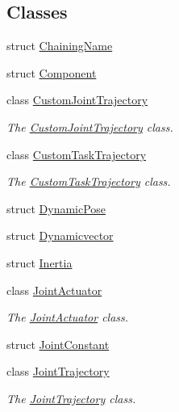 \subsection*{Classes}
\begin{DoxyCompactItemize}
\item 
struct \hyperlink{structrobotis__manipulator_1_1_chaining_name}{Chaining\+Name}
\item 
struct \hyperlink{structrobotis__manipulator_1_1_component}{Component}
\item 
class \hyperlink{classrobotis__manipulator_1_1_custom_joint_trajectory}{Custom\+Joint\+Trajectory}
\begin{DoxyCompactList}\small\item\em The \hyperlink{classrobotis__manipulator_1_1_custom_joint_trajectory}{Custom\+Joint\+Trajectory} class. \end{DoxyCompactList}\item 
class \hyperlink{classrobotis__manipulator_1_1_custom_task_trajectory}{Custom\+Task\+Trajectory}
\begin{DoxyCompactList}\small\item\em The \hyperlink{classrobotis__manipulator_1_1_custom_task_trajectory}{Custom\+Task\+Trajectory} class. \end{DoxyCompactList}\item 
struct \hyperlink{structrobotis__manipulator_1_1_dynamic_pose}{Dynamic\+Pose}
\item 
struct \hyperlink{structrobotis__manipulator_1_1_dynamicvector}{Dynamicvector}
\item 
struct \hyperlink{structrobotis__manipulator_1_1_inertia}{Inertia}
\item 
class \hyperlink{classrobotis__manipulator_1_1_joint_actuator}{Joint\+Actuator}
\begin{DoxyCompactList}\small\item\em The \hyperlink{classrobotis__manipulator_1_1_joint_actuator}{Joint\+Actuator} class. \end{DoxyCompactList}\item 
struct \hyperlink{structrobotis__manipulator_1_1_joint_constant}{Joint\+Constant}
\item 
class \hyperlink{classrobotis__manipulator_1_1_joint_trajectory}{Joint\+Trajectory}
\begin{DoxyCompactList}\small\item\em The \hyperlink{classrobotis__manipulator_1_1_joint_trajectory}{Joint\+Trajectory} class. \end{DoxyCompactList}\item 

\end{DoxyCompactItemize}
